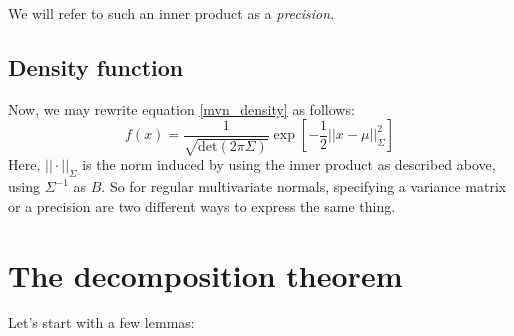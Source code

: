 \documentclass[12pt, a4paper]{article}
\numberwithin{equation}{section}
\begin{document}
We will refer to such an inner product as a \textit{precision}.

\subsection{Density function}
Now, we may rewrite equation \ref{mvn_density} as follows:
\begin{equation}
f(x)=\frac{1}{\sqrt{\textrm{det}(2\pi\Sigma)}}\exp\left[-\frac{1}{2}||x-\mu||_\Sigma^2\right]
\end{equation}
Here, $||\cdot||_\Sigma$ is the norm induced by using the inner product as described above, using $\Sigma^{-1}$ as $B$. So for regular multivariate normals, specifying a variance matrix or a precision are two different ways to express the same thing.

\section{The decomposition theorem}
Let's start with a few lemmas:
\end{document}
